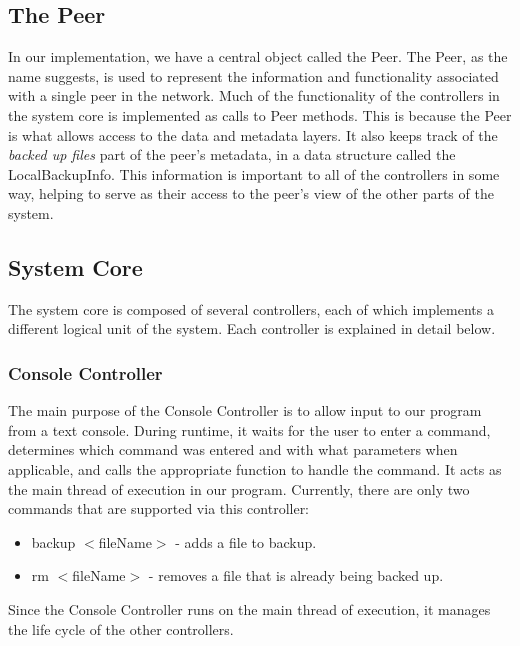 \documentclass[12pt]{report}
\begin{document}
\subsection{The Peer}
In our implementation, we have a central object called the Peer. The Peer, as the name suggests, is used to represent the information and functionality associated with a single peer in the network. Much of the functionality of the controllers in the system core is implemented as calls to Peer methods. This is because the Peer is what allows access to the data and metadata layers. It also keeps track of the \textit{backed up files} part of the peer's metadata, in a data structure called the LocalBackupInfo. This information is important to all of the controllers in some way, helping to serve as their access to the peer's view of the other parts of the system.

\subsection{System Core}
The system core is composed of several controllers, each of which implements a different logical unit of the system. Each controller is explained in detail below.

\subsubsection{Console Controller}
The main purpose of the Console Controller is to allow input to our program from a text console. During runtime, it waits for the user to enter a command, determines which command was entered and with what parameters when applicable, and calls the appropriate function to handle the command. It acts as the main thread of execution in our program. Currently, there are only two commands that are supported via this controller:
\begin{itemize}
\item backup  $<$fileName$>$ - adds a file to backup.
\item rm $<$fileName$>$ - removes a file that is already being backed up.
\end{itemize}

Since the Console Controller runs on the main thread of execution, it manages the life cycle of the other controllers.
\end{document}
